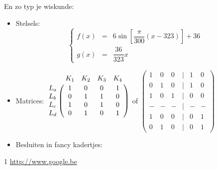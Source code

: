 \documentclass{article}
\begin{document}
En zo typ je wiskunde:
\begin{itemize}
\item Stelsels:
$$\left\{\begin{array}{rcl}
f(x)&=& 6\sin\left[\dfrac{\pi}{300}(x-323)\right]+36\\
g(x)&=& \dfrac{36}{323}x
\end{array}\right.$$

\item Matrices:
$\bordermatrix{\text{ }&K_1&K_2&K_3&K_4\cr
                L_a& 1 &  0  & 0 & 1\cr
                L_b& 0  &  1 & 1 & 0\cr
                L_c& 1 & 0 & 1 & 0\cr
                L_d& 0 & 1 & 0 & 1}$ of
$\begin{pmatrix}
1 & 0 & 0 & | & 1 & 0\\
0 & 1 & 0 & | & 1 & 0\\
1 & 0 & 1 & | & 0 & 0\\
- & - & - & | & - & -\\
1 & 0 & 0 & | & 0 & 1\\
0 & 1 & 0 & | & 0 & 1
\end{pmatrix}$

\item Besluiten in fancy kadertjes:

\end{itemize}

\begin{thebibliography}{1}
\url{http://www.google.be}



\end{thebibliography}
\end{document}
